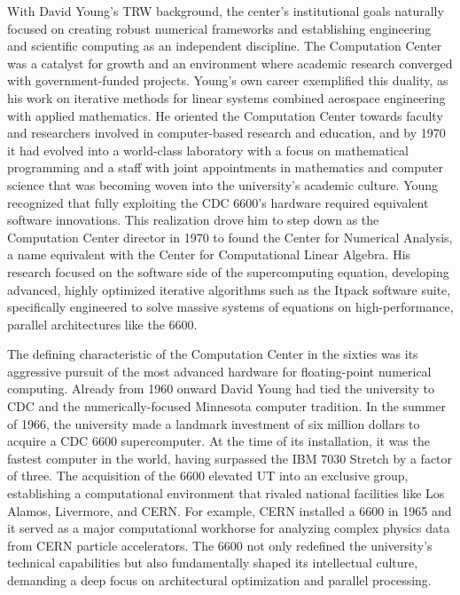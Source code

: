 With David Young's TRW background, the center’s institutional goals naturally focused on creating robust numerical frameworks and establishing engineering and scientific computing as an independent discipline. The Computation Center was a catalyst for growth and an environment where academic research converged with government-funded projects. Young’s own career exemplified this duality, as his work on iterative methods for linear systems combined aerospace engineering with applied mathematics. He oriented the Computation Center towards faculty and researchers involved in computer-based research and education, and by 1970 it had evolved into a world-class laboratory with a focus on mathematical programming and a staff with joint appointments in mathematics and computer science that was becoming woven into the university's academic culture. Young recognized that fully exploiting the CDC 6600's hardware required equivalent software innovations. This realization drove him to step down as the Computation Center director in 1970 to found the Center for Numerical Analysis, a name equivalent with the Center for Computational Linear Algebra. His research focused on the software side of the supercomputing equation, developing advanced, highly optimized iterative algorithms such as the Itpack software suite, specifically engineered to solve massive systems of equations on high-performance, parallel architectures like the 6600.

The defining characteristic of the Computation Center in the sixties was its aggressive pursuit of the most advanced hardware for floating-point numerical computing. Already from 1960 onward David Young had tied the university to CDC and the numerically-focused Minnesota computer tradition. In the summer of 1966, the university made a landmark investment of six million dollars to acquire a CDC 6600 supercomputer. At the time of its installation, it was the fastest computer in the world, having surpassed the IBM 7030 Stretch by a factor of three. The acquisition of the 6600 elevated UT into an exclusive group, establishing a computational environment that rivaled national facilities like Los Alamos, Livermore, and CERN. For example, CERN installed a 6600 in 1965 and it served as a major computational workhorse for analyzing complex physics data from CERN particle accelerators. The 6600 not only redefined the university's technical capabilities but also fundamentally shaped its intellectual culture, demanding a deep focus on architectural optimization and parallel processing.

